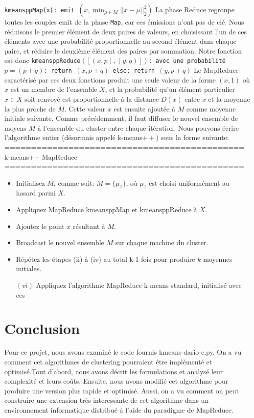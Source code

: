 \documentclass[12pt]{article}
\numberwithin{equation}{section}
\theoremstyle{plain}
\def\v1{\vskip0.2cm}
\def\no{\noindent}
\def\iti{\item[$(i)$]}
\def\itii{\item[$(ii)$]}
\def\itiii{\item[$(iii)$]}
\def\itiv{\item[$(iv)$]}
\def\itv{\item[$(v)$]}
\def\no{\noindent}
\begin{document}
\no \texttt{kmeansppMap(x):\vskip0.01cm emit $(x,\min_{\mu\in M} ||x-\mu ||^2_2 )$}
\v1
La phase Reduce regroupe toutes les couples emit de la phase \texttt{Map}, car ces émissions n'ont pas de clé. Nous réduisons le premier élément de deux paires de valeurs, en choisissant l'un de ces éléments avec une probabilité proportionnelle au second élément dans chaque paire, et réduire le deuxième élément des paires par sommation. Notre fonction est donc\vskip1cm
\no \texttt{kmeansppReduce$([(x, p), (y, q)])$:  \vskip0.01cm
avec une probabilité $p=(p + q)$: \vskip0.01cm \hskip0.5cm
return $(x, p + q)$  \vskip0.01cm
else:  \vskip0.011cm \hskip0.5cm
return $(y, p + q)$}
\v1
Le MapReduce caractérisé par ces deux fonctions produit une seule valeur de la forme $(x, 1)$ où $x$ est un membre de l'ensemble $X$, et la probabilité qu'un élément particulier $x \in X$ soit renvoyé est proportionnelle à la distance $D (x )$ entre $x$ et la moyenne la plus proche de $M$. Cette valeur $x$ est ensuite ajoutée à $M$ comme moyenne initiale suivante. Comme précédemment, il faut diffuser le nouvel ensemble de moyens $M$ à l'ensemble du cluster entre chaque itération. Nous pouvons écrire l'algorithme entier (désormais appelé k-means$++$) sous la forme suivante: 
\v1\no
=============================================\\
k-means++ MapReduce\\
=============================================
\begin{itemize}
\iti Initialisez $M$, comme suit: $M=\{\mu_1\}$, où $\mu_1$ est choisi uniformément au hasard parmi $X$.
\itii  Appliquez MapReduce kmeansppMap et kmeansppReduce à $X$.
\itiii Ajoutez le point $x$ résultant à $M$.
\itiv Broadcast le nouvel ensemble $M$ sur chaque machine du cluster.
\itv Répétez les étapes (ii) à (iv) au total k-1 fois pour produire $k$ moyennes initiales.
\item[$(vi)$] Appliquez l'algorithme MapReduce k-means standard, initialisé avec ces

\end{itemize}


\section{Conclusion}
Pour ce projet, nous avons examiné le code fournis kmeans-dario-c.py. On a vu comment cet algorithmes de clustering pourraient être implémenté et optimisé.Tout d'abord, nous avons décrit les formulations et analysé leur complexité et leurs coûts. Ensuite, nous avons modifié cet algorithme pour produire une version plus rapide et optimisé. Aussi, on a vu comment on peut construire une extension trés interessante de cet algorithme dans un environnement informatique distribué à l'aide du paradigme de MapReduce. 
\end{document}
